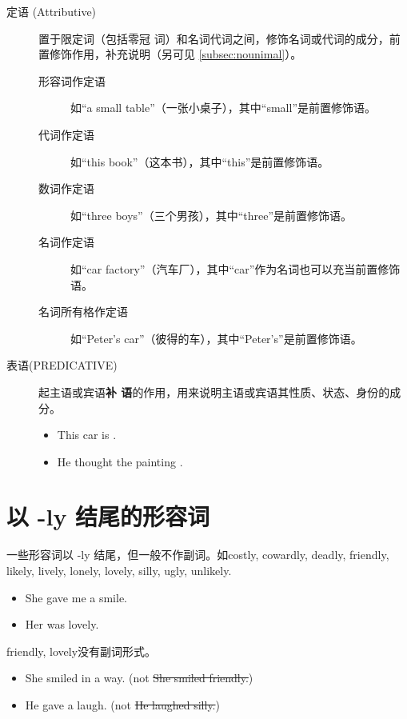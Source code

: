 \begin{description}
\item[定语 (Attributive)]  置于限定词（包括零冠
  词）和名词代词之间，修饰名词或代词的成分，前置修饰作用，补充说明（另可见 \cref{subsec:nounimal}）。
  \begin{description}
    \item[形容词作定语] 如“a small table”（一张小桌子），其中“small”是前置修饰语。
    \item[代词作定语] 如“this book”（这本书），其中“this”是前置修饰语。
    \item[数词作定语] 如“three boys”（三个男孩），其中“three”是前置修饰语。
    \item[名词作定语] 如“car factory”（汽车厂），其中“car”作为名词也可以充当前置修饰语。
    \item[名词所有格作定语] 如“Peter’s car”（彼得的车），其中“Peter’s”是前置修饰语。
  \end{description}

\item[表语(PREDICATIVE)]  起主语或宾语\textbf{补
    语}的作用，用来说明主语或宾语其性质、状态、身份的成分。
  \begin{itemize}
  \item This car is .

  \item He thought the painting .
  \end{itemize}
\end{description}

\section{以 -ly 结尾的形容词}

一些形容词以 -ly 结尾，但一般不作副词。如costly, cowardly, deadly, friendly,
likely, lively, lonely, lovely, silly, ugly, unlikely.

\begin{itemize}
\item She gave me a  smile.

\item Her  was lovely.
\end{itemize}

friendly, lovely没有副词形式。
\begin{itemize}
\item She smiled in a  way. (not \sout{She smiled friendly.})
\item He gave a  laugh. (not \sout{He laughed silly.})
\end{itemize}

